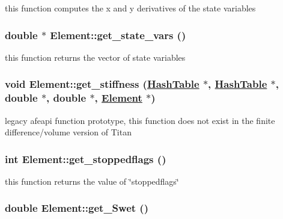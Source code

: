 this function computes the x and y derivatives of the state variables 

\hypertarget{classElement_a65}{
\subsubsection[get\_\-state\_\-vars]{\setlength{\rightskip}{0pt plus 5cm}double $\ast$ Element::get\_\-state\_\-vars ()}}
\label{classElement_a65}


this function returns the vector of state variables 

\hypertarget{classElement_a9}{
\subsubsection[get\_\-stiffness]{\setlength{\rightskip}{0pt plus 5cm}void Element::get\_\-stiffness (\hyperlink{classHashTable}{Hash\-Table} $\ast$, \hyperlink{classHashTable}{Hash\-Table} $\ast$, double $\ast$, double $\ast$, \hyperlink{classElement}{Element} $\ast$)}}
\label{classElement_a9}


legacy afeapi function prototype, this function does not exist in the finite difference/volume version of Titan 

\hypertarget{classElement_a107}{
\subsubsection[get\_\-stoppedflags]{\setlength{\rightskip}{0pt plus 5cm}int Element::get\_\-stoppedflags ()}}
\label{classElement_a107}


this function returns the value of \char`\"{}stoppedflags\char`\"{} 

\hypertarget{classElement_a123}{
\subsubsection[get\_\-Swet]{\setlength{\rightskip}{0pt plus 5cm}double Element::get\_\-Swet ()}}
\label{classElement_a123}


